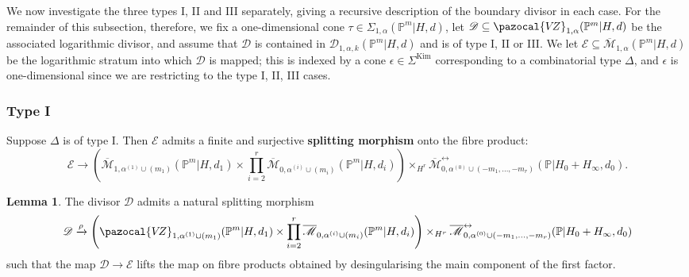 \documentclass[11pt]{amsart}
\newcommand{\Kim}{\operatorname{Kim}}
\newcommand{\PP}{\mathbb P}
\newcommand{\VZ}{\pazocal{V\!Z}}
\renewcommand{\to}{\rightarrow}
\newcommand{\Mcal}{\mathcal{M}}
\newcommand{\Dcal}{\mathcal{D}}
\newcommand{\Ecal}{\mathcal{E}}
\newcommand{\ol}[1]{\overline{#1}}
\theoremstyle{definition}
\newtheorem{lemma}[thm]{Lemma}
\theoremstyle{definition}
\begin{document}
We now investigate the three types I, II and III separately, giving a recursive description of the boundary divisor in each case. For the remainder of this subsection, therefore, we fix a one-dimensional cone $\tau \in \Sigma_{1,\alpha}(\PP^m|H,d)$, let $\Dcal \subseteq \VZ_{1,\alpha}(\PP^m|H,d)$ be the associated logarithmic divisor, and assume that $\Dcal$ is contained in $\Dcal_{1,\alpha,k}(\PP^m|H,d)$ and is of type I, II or III. We let $\Ecal \subseteq \ol\Mcal_{1,\alpha}(\PP^m|H,d)$ be the logarithmic stratum into which $\Dcal$ is mapped; this is indexed by a cone $\epsilon \in \Sigma^{\Kim}$ corresponding to a combinatorial type $\Delta$, and $\epsilon$ is one-dimensional since we are restricting to the type I, II, III cases.


\subsubsection{Type I}\label{subsubsection type A} Suppose $\Delta$ is of type I. Then $\Ecal$ admits a finite and surjective \textbf{splitting morphism} onto the fibre product:
\begin{equation*} \Ecal \to \left( \ol\Mcal_{1,\alpha^{(1)}\cup(m_1)}(\PP^m|H,d_1) \times \prod_{i=2}^r \ol\Mcal_{0,\alpha^{(i)}\cup(m_i)}(\PP^m|H,d_i) \right) \times_{H^r} \ol\Mcal^{\leftrightarrow}_{0,\alpha^{(0)}\cup (-m_1,\ldots,-m_r)}(\mathbb{P}|H_0+H_\infty,d_0).\end{equation*}

\begin{lemma} \label{Lemma type A gluing} The divisor $\Dcal$ admits a natural splitting morphism
\begin{equation*}\Dcal \xrightarrow{\rho} \left(\VZ_{1,\alpha^{(1)}\cup(m_1)}(\PP^m|H,d_1)\times\prod_{i=2}^r \ol\Mcal_{0,\alpha^{(i)}\cup(m_i)}(\PP^m|H,d_i)\right) \times_{H^r} \ol\Mcal^{\leftrightarrow}_{0,\alpha^{(0)}\cup (-m_1,\ldots,-m_r)}(\mathbb{P}|H_0+H_\infty,d_0)\end{equation*}
such that the map $\Dcal \to \Ecal$ lifts the map on fibre products obtained by desingularising the main component of the first factor.\end{lemma}
\end{document}
